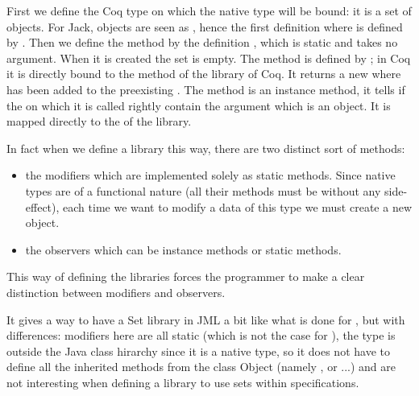 First we define the Coq type on which the  native type 
will be bound: it is a set of objects. For Jack, objects are seen as 
, hence the first definition where  
is defined by .
Then we define the method  by the definition 
, which is static and takes no argument. 
When it is created the set is empty.
The  method is defined by ; in Coq it is 
directly bound to the  method of the library  
of Coq. 
It returns a new  where  has been added to
the preexisting  .
The  method is an instance method, it tells if the 
 on which it is called rightly
contain the argument  which is an object. It is mapped directly to the 
 of the  library.


In fact when we define a library this way, there are two distinct sort of 
methods:
\begin{itemize}
\item the modifiers which are implemented solely as static methods. 
Since native types are of a functional nature (all their methods must be without any side-effect), 
each time we want to modify a data of this type we must create a new object.
\item the observers which can be instance methods or static methods.
\end{itemize}
This way of defining the libraries forces the programmer to make a clear distinction 
between modifiers and observers.

   
 It gives a way to have a Set library in JML a bit like what is done for 
\cite{LPCCR-03-JML}, but with differences: modifiers here are all static
(which is not the case for  ),
 the  type is outside the Java class hirarchy since it is a native type,
so it does not have 
to define all the inherited methods from the class Object 
(namely ,  or 
...) and are not interesting when defining a library to use sets within specifications.
